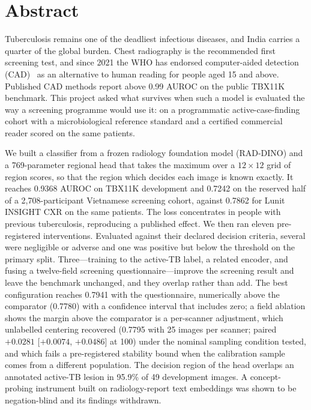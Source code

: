 \documentclass[12pt,a4paper]{report}
\newcommand{\ci}[2]{[$#1$, $#2$]}
\begin{document}
\chapter*{Abstract}
Tuberculosis remains one of the deadliest infectious diseases, and India carries a quarter of the global burden. Chest radiography is the recommended first screening test, and since 2021 the WHO has endorsed computer-aided detection (CAD)~\cite{who2021} as an alternative to human reading for people aged 15 and above. Published CAD methods report above 0.99 AUROC on the public TBX11K benchmark. This project asked what survives when such a model is evaluated the way a screening programme would use it: on a programmatic active-case-finding cohort with a microbiological reference standard and a certified commercial reader scored on the same patients.

We built a classifier from a frozen radiology foundation model (RAD-DINO) and a 769-parameter regional head that takes the maximum over a $12\times12$ grid of region scores, so that the region which decides each image is known exactly. It reaches 0.9368 AUROC on TBX11K development and 0.7242 on the reserved half of a 2,708-participant Vietnamese screening cohort, against 0.7862 for Lunit INSIGHT CXR on the same patients. The loss concentrates in people with previous tuberculosis, reproducing a published effect. We then ran eleven pre-registered interventions. Evaluated against their declared decision criteria, several were negligible or adverse and one was positive but below the threshold on the primary split. Three---training to the active-TB label, a related encoder, and fusing a twelve-field screening questionnaire---improve the screening result and leave the benchmark unchanged, and they overlap rather than add. The best configuration reaches 0.7941 with the questionnaire, numerically above the comparator (0.7780) with a confidence interval that includes zero; a field ablation shows the margin above the comparator is a per-scanner adjustment, which unlabelled centering recovered (0.7795 with 25 images per scanner; paired $+0.0281$ \ci{+0.0074}{+0.0486} at 100) under the nominal sampling condition tested, and which fails a pre-registered stability bound when the calibration sample comes from a different population. The decision region of the head overlaps an annotated active-TB lesion in 95.9\% of 49 development images. A concept-probing instrument built on radiology-report text embeddings was shown to be negation-blind and its findings withdrawn.
\end{document}
